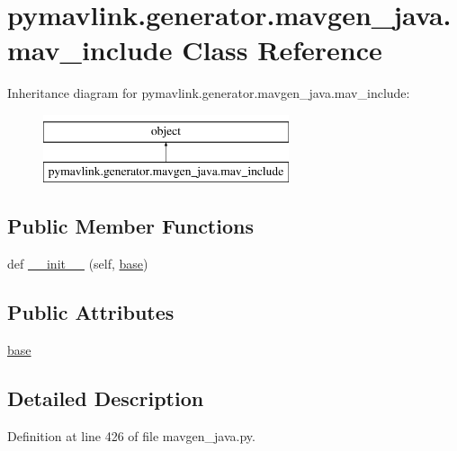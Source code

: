 \hypertarget{classpymavlink_1_1generator_1_1mavgen__java_1_1mav__include}{}\section{pymavlink.\+generator.\+mavgen\+\_\+java.\+mav\+\_\+include Class Reference}
\label{classpymavlink_1_1generator_1_1mavgen__java_1_1mav__include}
Inheritance diagram for pymavlink.\+generator.\+mavgen\+\_\+java.\+mav\+\_\+include\+:\begin{figure}[H]
\begin{center}
\leavevmode
\includegraphics[height=2.000000cm]{classpymavlink_1_1generator_1_1mavgen__java_1_1mav__include}
\end{center}
\end{figure}
\subsection*{Public Member Functions}
\begin{DoxyCompactItemize}
\item 
def \mbox{\hyperlink{classpymavlink_1_1generator_1_1mavgen__java_1_1mav__include_a1bc1ed7cfef7a94f8ab9f9f8f5d7afad}{\+\_\+\+\_\+init\+\_\+\+\_\+}} (self, \mbox{\hyperlink{classpymavlink_1_1generator_1_1mavgen__java_1_1mav__include_a47b56477ee0fc60313b62235eabdd5e5}{base}})
\end{DoxyCompactItemize}
\subsection*{Public Attributes}
\begin{DoxyCompactItemize}
\item 
\mbox{\hyperlink{classpymavlink_1_1generator_1_1mavgen__java_1_1mav__include_a47b56477ee0fc60313b62235eabdd5e5}{base}}
\end{DoxyCompactItemize}


\subsection{Detailed Description}


Definition at line 426 of file mavgen\+\_\+java.\+py.



